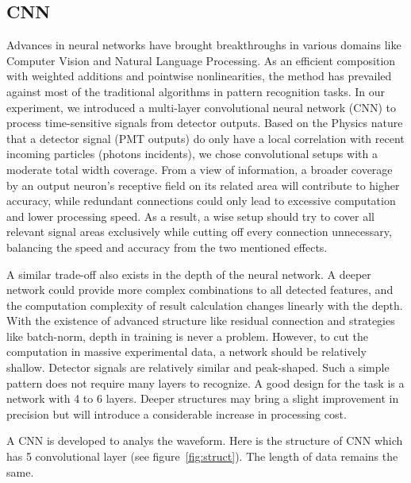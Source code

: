 \subsection{CNN}


Advances in neural networks have brought breakthroughs in various domains like Computer Vision and Natural Language Processing. As an efficient composition with weighted additions and pointwise nonlinearities, the method has prevailed against most of the traditional algorithms in pattern recognition tasks. In our experiment, we introduced a multi-layer convolutional neural network (CNN) to process time-sensitive signals from detector outputs. Based on the Physics nature that a detector signal (PMT outputs) do only have a local correlation with recent incoming particles (photons incidents), we chose convolutional setups with a moderate total width coverage. From a view of information, a broader coverage by an output neuron's receptive field on its related area will contribute to higher accuracy, while redundant connections could only lead to excessive computation and lower processing speed. As a result, a wise setup should try to cover all relevant signal areas exclusively while cutting off every connection unnecessary, balancing the speed and accuracy from the two mentioned effects.

A similar trade-off also exists in the depth of the neural network. A deeper network could provide more complex combinations to all detected features, and the computation complexity of result calculation changes linearly with the depth. With the existence of advanced structure like residual connection and strategies like batch-norm, depth in training is never a problem. However, to cut the computation in massive experimental data, a network should be relatively shallow. Detector signals are relatively similar and peak-shaped. Such a simple pattern does not require many layers to recognize. A good design for the task is a network with 4 to 6 layers. Deeper structures may bring a slight improvement in precision but will introduce a considerable increase in processing cost.

A CNN is developed to analys the waveform. Here is the structure of CNN which has 5 convolutional layer (see figure~\ref{fig:struct}). The length of data remains the same. 

